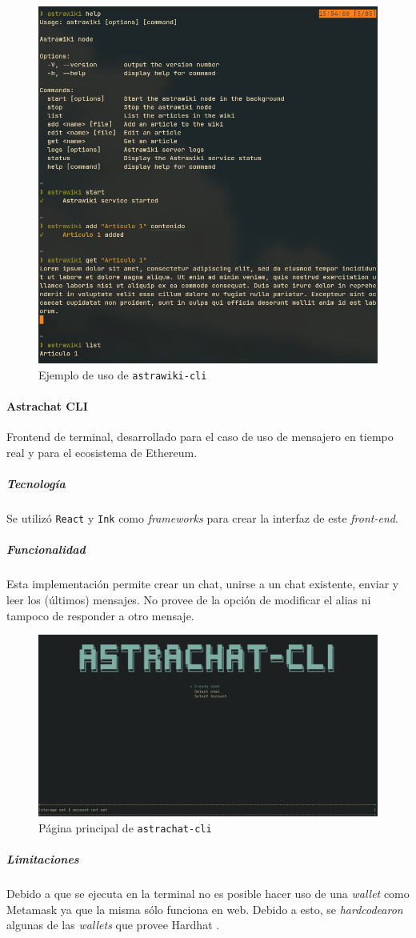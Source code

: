 \begin{figure}[H]
    \centering
    \includegraphics[width=0.7\linewidth]{img/astrawiki-cli.png}
    \caption{Ejemplo de uso de \texttt{astrawiki-cli}}
    \label{fig:astrawiki-cli}
\end{figure}

\paragraph{Astrachat CLI}

Frontend de terminal, desarrollado para el caso de uso de mensajero en tiempo real y para el ecosistema de Ethereum.

\subparagraph{Tecnología}

Se utilizó \texttt{React} \cite{react} y \texttt{Ink} \cite{ink} como \textit{frameworks} para crear la interfaz de este \textit{front-end}.

\subparagraph{Funcionalidad}

Esta implementación permite crear un chat, unirse a un chat existente, enviar y leer los (últimos) mensajes. No provee de la opción de modificar el alias ni tampoco de responder a otro mensaje.

\begin{figure}[H]
    \centering
    \includegraphics[width=1\linewidth]{img/astrachat-cli-main-page.png}
    \caption{Página principal de \texttt{astrachat-cli}}
    \label{fig:astrachat-cli-main-page}
\end{figure}

\subparagraph{Limitaciones}

Debido a que se ejecuta en la terminal no es posible hacer uso de una \textit{wallet} como Metamask \cite{metamask} ya que la misma sólo funciona en web. Debido a esto, se \textit{hardcodearon} algunas de las \textit{wallets} que provee Hardhat \cite{hardhat}.